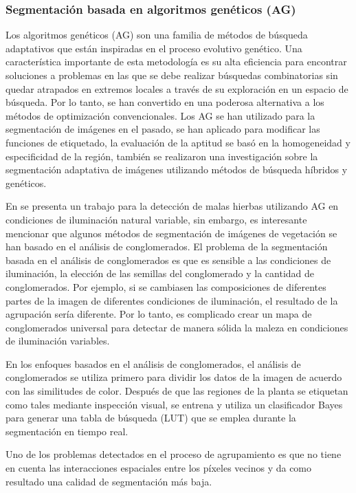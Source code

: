 \documentclass[conference,compsoc]{IEEEtran}
\begin{document}
\subsubsection{Segmentación basada en algoritmos genéticos (AG)}
Los algoritmos genéticos (AG) son una familia de métodos de búsqueda adaptativos que están inspiradas en el proceso evolutivo genético. Una característica importante de esta metodología es su alta eficiencia para encontrar soluciones a problemas en las que se debe realizar búsquedas combinatorias sin quedar atrapados en extremos locales a través de su exploración en un espacio de búsqueda. Por lo tanto, se han convertido en una poderosa alternativa a los métodos de optimización convencionales\cite{algen}. Los AG se han utilizado para la segmentación de imágenes en el pasado, se han aplicado para modificar las funciones de etiquetado, la evaluación de la aptitud se basó en la homogeneidad y especificidad de la región, también se realizaron una investigación sobre la segmentación adaptativa de imágenes utilizando métodos de búsqueda híbridos y genéticos.

En\cite{algen} se presenta un trabajo para la detección de malas hierbas utilizando AG en condiciones de iluminación natural variable, sin embargo, es interesante mencionar que algunos métodos de segmentación de imágenes de vegetación se han basado en el análisis de conglomerados. El problema de la segmentación basada en el análisis de conglomerados es que es sensible a las condiciones de iluminación, la elección de las semillas del conglomerado y la cantidad de conglomerados. Por ejemplo, si se cambiasen las composiciones de diferentes partes de la imagen de diferentes condiciones de iluminación, el resultado de la agrupación sería diferente. Por lo tanto, es complicado crear un mapa de conglomerados universal para detectar de manera sólida la maleza en condiciones de iluminación variables.

En los enfoques basados en el análisis de conglomerados, el análisis de conglomerados se utiliza primero para dividir los datos de la imagen de acuerdo con las similitudes de color. Después de que las regiones de la planta se etiquetan como tales mediante inspección visual, se entrena y utiliza un clasificador Bayes para generar una tabla de búsqueda (LUT) que se emplea durante la segmentación en tiempo real.

Uno de los problemas detectados en el proceso de agrupamiento es que no tiene en cuenta las interacciones espaciales entre los píxeles vecinos y da como resultado una calidad de segmentación más baja.
\end{document}
